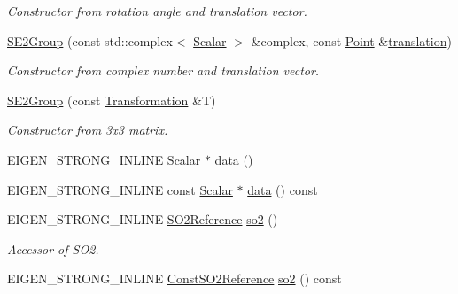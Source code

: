 \begin{DoxyCompactItemize}
\begin{DoxyCompactList}\small\item\em Constructor from rotation angle and translation vector. \end{DoxyCompactList}\item 
\hyperlink{class_sophus_1_1_s_e2_group_ae04e1102f0aa8cd87345a777e43533c6}{S\+E2\+Group} (const std\+::complex$<$ \hyperlink{class_sophus_1_1_s_e2_group_a2c3f69904c79825984774d78a107ab35}{Scalar} $>$ \&complex, const \hyperlink{class_sophus_1_1_s_e2_group_a2c5e73ee0291af22e7cf6194caee546b}{Point} \&\hyperlink{class_sophus_1_1_s_e2_group_a6e63c40c66f69c7b363570a532b90aab}{translation})
\begin{DoxyCompactList}\small\item\em Constructor from complex number and translation vector. \end{DoxyCompactList}\item 
\hyperlink{class_sophus_1_1_s_e2_group_ac1f39ff125e3e2be151e9dcb0c555706}{S\+E2\+Group} (const \hyperlink{class_sophus_1_1_s_e2_group_a53519178925a6384fbffa13451e6011d}{Transformation} \&T)
\begin{DoxyCompactList}\small\item\em Constructor from 3x3 matrix. \end{DoxyCompactList}\item 
E\+I\+G\+E\+N\+\_\+\+S\+T\+R\+O\+N\+G\+\_\+\+I\+N\+L\+I\+NE \hyperlink{class_sophus_1_1_s_e2_group_a2c3f69904c79825984774d78a107ab35}{Scalar} $\ast$ \hyperlink{class_sophus_1_1_s_e2_group_a748b0248723a888eb712349027eeb123}{data} ()
\item 
E\+I\+G\+E\+N\+\_\+\+S\+T\+R\+O\+N\+G\+\_\+\+I\+N\+L\+I\+NE const \hyperlink{class_sophus_1_1_s_e2_group_a2c3f69904c79825984774d78a107ab35}{Scalar} $\ast$ \hyperlink{class_sophus_1_1_s_e2_group_a76dbc3478e64eaebce1972ce3eadcf43}{data} () const 
\item 
E\+I\+G\+E\+N\+\_\+\+S\+T\+R\+O\+N\+G\+\_\+\+I\+N\+L\+I\+NE \hyperlink{class_sophus_1_1_s_e2_group_a053aa9fd3ee6259f817472e7e4c46a06}{S\+O2\+Reference} \hyperlink{class_sophus_1_1_s_e2_group_a6f3c739ac63f076ce266409558ede468}{so2} ()\hypertarget{class_sophus_1_1_s_e2_group_a6f3c739ac63f076ce266409558ede468}{}\label{class_sophus_1_1_s_e2_group_a6f3c739ac63f076ce266409558ede468}

\begin{DoxyCompactList}\small\item\em Accessor of S\+O2. \end{DoxyCompactList}\item 
E\+I\+G\+E\+N\+\_\+\+S\+T\+R\+O\+N\+G\+\_\+\+I\+N\+L\+I\+NE \hyperlink{class_sophus_1_1_s_e2_group_a370e66451d1133612595dc3fb30e07cf}{Const\+S\+O2\+Reference} \hyperlink{class_sophus_1_1_s_e2_group_afc84a8f7f21ef10e729160dd20ebf81e}{so2} () const \hypertarget{class_sophus_1_1_s_e2_group_afc84a8f7f21ef10e729160dd20ebf81e}{}\label{class_sophus_1_1_s_e2_group_afc84a8f7f21ef10e729160dd20ebf81e}


\end{DoxyCompactItemize}
